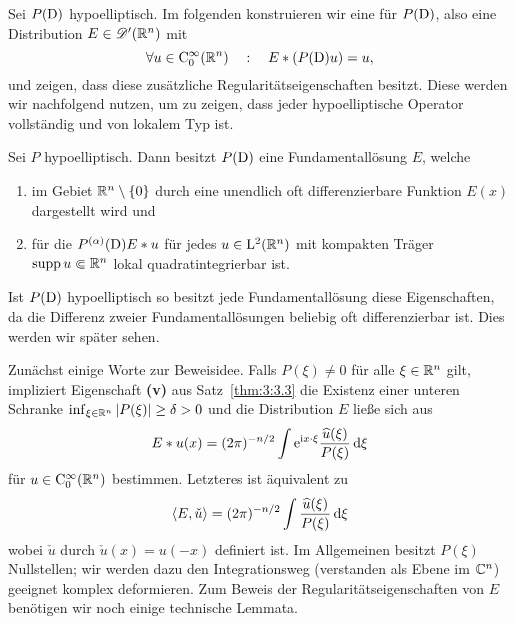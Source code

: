 Sei $P(\mathrm D)$ hypoelliptisch. Im folgenden konstruieren wir eine  für $P(\mathrm D)$, also eine Distribution $E\in\mathscr D'(\mathbb R^n)$ mit
\begin{equation}
\forall u\in\mathrm C_0^\infty(\mathbb R^n)\quad:\quad E*(P(\mathrm D) u) = u,
\end{equation}
und zeigen, dass diese zusätzliche Regularitätseigenschaften besitzt. Diese werden wir nachfolgend nutzen, um zu zeigen, dass jeder hypoelliptische Operator vollständig und von lokalem Typ ist. 
\begin{thm}\label{fundamental_exist}
Sei $P$ hypoelliptisch. Dann besitzt $P(\mathrm D)$ eine Fundamentallösung $E$, welche 
\begin{enumerate}
\item im Gebiet $\mathbb R^n\setminus\{0\}$  durch eine unendlich oft differenzierbare Funktion $E(x)$ dargestellt wird und
\item für die $P^{(\alpha)}(\mathrm D) E*u$ für jedes $u\in \mathrm L^2(\mathbb R^n)$ mit kompakten Träger $\operatorname{supp} u\Subset\mathbb R^n$ lokal quadratintegrierbar ist. 
\end{enumerate}
\end{thm}
\begin{rem}
Ist $P(\mathrm D)$ hypoelliptisch so besitzt jede Fundamentallösung diese Eigenschaften, da die Differenz zweier Fundamentallösungen beliebig oft differenzierbar ist. Dies werden wir später sehen.
\end{rem}

Zunächst einige Worte zur Beweisidee.  Falls $P(\xi)\neq 0$ für alle $\xi\in \mathbb R^n$ gilt, impliziert  Eigenschaft {\bf (v)} aus Satz~\ref{thm:3:3.3}  die Existenz einer unteren Schranke
$\inf_{\xi\in\mathbb R^n} |P(\xi)|\ge\delta>0$ und die Distribution $E$ ließe sich aus
\begin{equation}\label{distr1}
E*u(x) = (2\pi)^{-n/2}\int \mathrm e^{\mathrm i x\cdot \xi} \frac{\widehat u(\xi)}{P(\xi)}\,\mathrm d \xi
\end{equation}
für $u\in\mathrm C_0^\infty(\mathbb R^n)$ bestimmen. Letzteres ist  äquivalent zu
\begin{equation}\label{distr2}
\langle E,\check u\rangle = (2\pi)^{-n/2} \int \frac{\widehat u(\xi)}{P(\xi)}\,\mathrm d \xi
\end{equation}
wobei $\check u$ durch $\check u(x)=u(-x)$ definiert ist. Im Allgemeinen besitzt $P(\xi)$ Nullstellen; wir werden dazu den Integrationsweg (verstanden als Ebene im $\mathbb C^n$) geeignet komplex deformieren. Zum Beweis der Regularitätseigenschaften von $E$ benötigen wir noch einige technische Lemmata.

